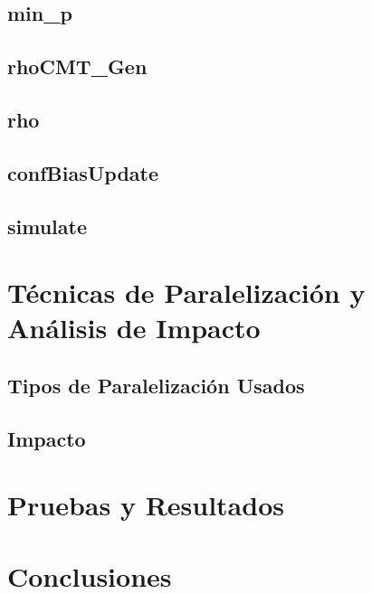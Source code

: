 \documentclass{article}
\begin{document}
    \subsection{min\_p}

    \subsection{rhoCMT\_Gen}

    \subsection{rho}

    \subsection{confBiasUpdate}

    \subsection{simulate}

  \section{Técnicas de Paralelización y Análisis de Impacto}

    \subsection{Tipos de Paralelización Usados}

    \subsection{Impacto}

  \section{Pruebas y Resultados}

  \section{Conclusiones}
\end{document}
